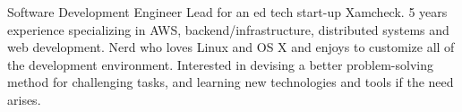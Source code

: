 

\begin{cvparagraph}

Software Development Engineer Lead for an ed tech start-up Xamcheck. 5 years experience specializing in AWS, backend/infrastructure, distributed systems and web development. Nerd who loves Linux and OS X and enjoys to customize all of the development environment. Interested in devising a better problem-solving method for challenging tasks, and learning new technologies and tools if the need arises.
\end{cvparagraph}
